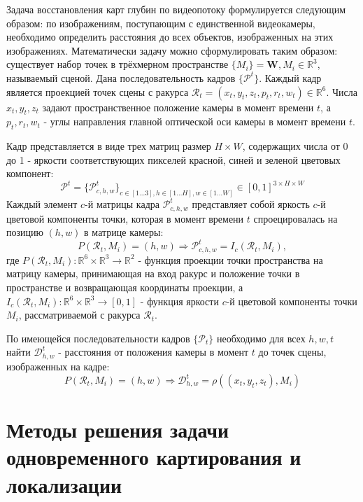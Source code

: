 \documentclass{mipt-thesis-bs}
\begin{document}
Задача восстановления карт глубин по видеопотоку формулируется следующим образом: по изображениям, поступающим с единственной видеокамеры, необходимо определить расстояния до всех объектов, изображенных на этих изображениях. Математически задачу можно сформулировать таким образом: существует набор точек в трёхмерном пространстве $\{M_i \} = \textbf{W}, M_i \in \mathbb{R}^3$, называемый сценой. Дана последовательность кадров $\{\mathcal{P}^t\}$. Каждый кадр является проекцией точек сцены с ракурса $\mathcal{R}_t = (x_t, y_t, z_t, p_t, r_t, w_t) \in \mathbb{R}^6$. Числа $x_t, y_t, z_t$ задают пространственное положение камеры в момент времени $t$, а $p_t, r_t, w_t$ - углы направления главной оптической оси камеры в момент времени $t$.

Кадр представляется в виде трех матриц размер $H \times W$, содержащих числа от 0 до 1 - яркости соответствующих пикселей красной, синей и зеленой цветовых компонент:
$$\mathcal{P}^t = \{\mathcal{P}^t_{c,h,w}\}_{c \in [1 \dots 3], h \in [1 \dots H], w \in [1 \dots W]} \in [0, 1]^{3 \times H \times W}$$
Каждый элемент $c$-й матрицы кадра $\mathcal{P}^t_{c,h,w}$ представляет собой яркость $c$-й цветовой компоненты точки, которая в момент времени $t$ спроецировалась на позицию $(h, w)$ в матрице камеры:
$$P(\mathcal{R}_t, M_i) = (h, w) \Rightarrow \mathcal{P}^t_{c,h,w} = I_c(\mathcal{R}_t, M_i),$$
где $P(\mathcal{R}_t, M_i): \mathbb{R}^6 \times \mathbb{R}^3 \rightarrow \mathbb{R}^2$ - функция проекции точки пространства на матрицу камеры, принимающая на вход ракурс и положение точки в пространстве и возвращающая координаты проекции, а $I_c (\mathcal{R}_t, M_i): \mathbb{R}^6 \times \mathbb{R}^3 \rightarrow [0, 1]$ - функция яркости $c$-й цветовой компоненты точки $M_i$, рассматриваемой с ракурса $\mathcal{R}_t$.

По имеющейся последовательности кадров $\{\mathcal{P}_t\}$ необходимо для всех $h,w,t$ найти $\mathcal{D}^t_{h,w}$ - расстояния от положения камеры в момент $t$ до точек сцены, изображенных на кадре:
$$P(\mathcal{R}_t, M_i) = (h, w) \Rightarrow \mathcal{D}^t_{h,w} = \rho((x_t, y_t, z_t), M_i)$$



\chapter{Методы решения задачи одновременного картирования и локализации}
\end{document}
